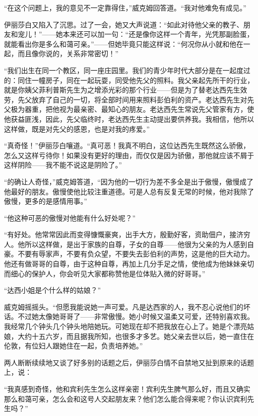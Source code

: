 \par “在这个问题上，我的意见不一定靠得住，”威克姆回答道。“我对他难免有成见。”
\par 伊丽莎白又陷入了沉思。过了一会，她又大声说道：“如此对待他父亲的教子、朋友和宠儿！”——她本来还可以加一句：“还是像你这样一个青年，光凭那副脸蛋，就能看出你是多么和蔼可亲。”——但她毕竟只能这样说：“何况你从小就和他在一起，而且像你说的，关系非常密切！”
\par “我们出生在同一个教区，同一座庄园里。我们的青少年时代大部分是在一起度过的：同住一幢房子，同在一起玩耍，同受他先父的照料。我父亲起先所干的行业，就是你姨父菲利普斯先生为之增添光彩的那个行业——但是为了替老达西先生效劳，先父放弃了自己的一切，将全部时间用来照料彭伯利的资产。老达西先生对先父极为器重，把他视为最亲密、最知心的朋友。老达西先生常说先父管家有方，使他获益匪浅，因此，先父临终时，老达西先生主动提出要供养我。我相信，他所以这样做，既是对先父的感恩，也是对我的疼爱。”
\par “真奇怪！”伊丽莎白嚷道。“真可恶！我真不明白，这位达西先生既然这么骄傲，怎么又这样亏待你！如果没有更好的理由，而仅仅是因为骄傲，那他就应该不屑于这样阴险——我不能不说这是阴险了。”
\par “的确让人奇怪，”威克姆答道，“因为他的一切行为差不多全是出于傲慢，傲慢成了他最好的朋友。傲慢使他比较注重道德。可是人总有反复无常的时候，他对我除了傲慢，更多的是感情用事。”
\par “他这种可恶的傲慢对他能有什么好处呢？”
\par “有好处。他常常因此而变得慷慨豪爽，出手大方，殷勤好客，资助佃户，接济穷人。他所以这样做，是出于家族的自尊，子女的自尊——他很为父亲的为人感到自豪。不要有辱家声，不要有负众望，不要失去彭伯利的声势，这是他的巨大动力。他还有做哥哥的自尊，由于这种自尊，再加上几分手足之情，使他成为他妹妹亲切而细心的保护人，你会听见大家都称赞他是位体贴入微的好哥哥。”
\par “达西小姐是个什么样的姑娘？”
\par 威克姆摇摇头。“但愿我能说她一声可爱。凡是达西家的人，我不忍心说他们的坏话。不过她太像她哥哥了——非常傲慢。她小时候又温柔又可爱，还特别喜欢我。我经常几个钟头几个钟头地陪她玩。可她现在却不把我放在心上了。她是个漂亮姑娘，大约十五六岁，而且据我所知，也很多才多艺。她父亲去世以后，她一直住在伦敦，有位妇人跟她住在一起，负责培养她。”
\par 两人断断续续地又谈了好多别的话题之后，伊丽莎白情不自禁地又扯到原来的话题上，说：
\par “我真感到奇怪，他和宾利先生怎么这样亲密！宾利先生脾气那么好，而且又确实那么和蔼可亲，怎么会和这号人交起朋友来？他们怎么能合得来呢？你认识宾利先生吗？”
